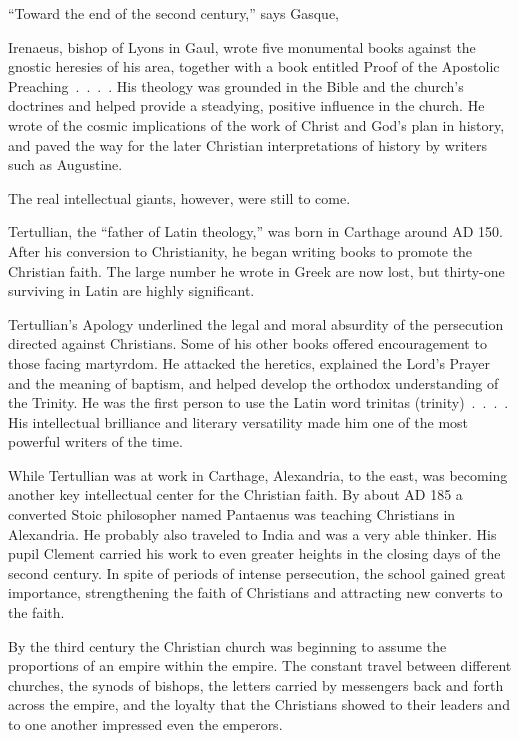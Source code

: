 “Toward the end of the second century,” says Gasque,

\begin{blockquote}
Irenaeus, bishop of Lyons in Gaul, wrote five monumental books against the gnostic heresies of his
area, together with a book entitled Proof of the Apostolic Preaching~.~.~.~. His theology was
grounded in the Bible and the church’s doctrines and helped provide a steadying, positive influence
in the church. He wrote of the cosmic implications of the work of Christ and God’s plan in history,
and paved the way for the later Christian interpretations of history by writers such as Augustine.
\end{blockquote}

The real intellectual giants, however, were still to come.

Tertullian, the “father of Latin theology,” was born in Carthage around AD 150. After his conversion
to Christianity, he began writing books to promote the Christian faith. The large number he wrote in
Greek are now lost, but thirty-one surviving in Latin are highly significant.

\begin{blockquote}
Tertullian’s Apology underlined the legal and moral absurdity of the persecution directed against
Christians. Some of his other books offered encouragement to those facing martyrdom. He attacked the
heretics, explained the Lord’s Prayer and the meaning of baptism, and helped develop the orthodox
understanding of the Trinity. He was the first person to use the Latin word trinitas
(trinity)~.~.~.~. His intellectual brilliance and literary versatility made him one of the most
powerful writers of the time.
\end{blockquote}

While Tertullian was at work in Carthage, Alexandria, to the east, was becoming another key
intellectual center for the Christian faith. By about AD 185 a converted Stoic philosopher named
Pantaenus was teaching Christians in Alexandria. He probably also traveled to India and was a very
able thinker. His pupil Clement carried his work to even greater heights in the closing days of the
second century. In spite of periods of intense persecution, the school gained great importance,
strengthening the faith of Christians and attracting new converts to the faith.

By the third century the Christian church was beginning to assume the proportions of an empire
within the empire. The constant travel between different churches, the synods of bishops, the
letters carried by messengers back and forth across the empire, and the loyalty that the Christians
showed to their leaders and to one another impressed even the emperors.

